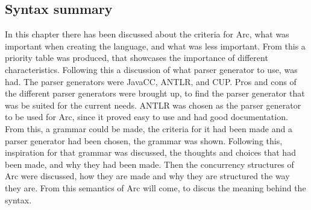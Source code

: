 \subsection{Syntax summary}
In this chapter there has been discussed about the criteria for Arc, what was important when creating the language, and what was less important. From this a priority table was produced, that showcases the importance of different characteristics. Following this a discussion of what parser generator to use, was had. The parser generators were JavaCC, ANTLR, and CUP. Pros and cons of the different parser generators were brought up, to find the parser generator that was be suited for the current needs. ANTLR was chosen as the parser generator to be used for Arc, since it proved easy to use and had good documentation.  From this, a grammar could be made, the criteria for it had been made and a parser generator had been chosen, the grammar was shown. Following this, inspiration for that grammar was discussed, the thoughts and choices that had been made, and why they had been made. Then the concurrency structures of Arc were discussed, how they are made and why they are structured the way they are. From this semantics of Arc will come, to discus the meaning behind the syntax. 


